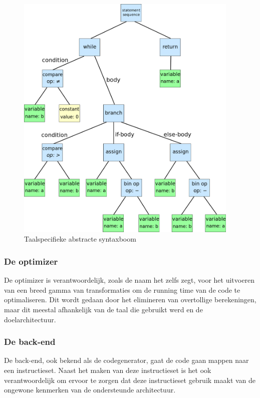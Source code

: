 \begin{figure} [ht]
	\centering
	\includegraphics[width=0.95\textwidth]{img/syntaxtree.png}
	\caption{Taalspecifieke abstracte syntaxboom}
	\label{fig:syntaxtree}
\end{figure}

\subsubsection{De optimizer}
De optimizer is verantwoordelijk, zoals de naam het zelfs zegt, voor het uitvoeren van een breed gamma van transformaties om de running time van de code te optimaliseren. Dit wordt gedaan door het elimineren van overtollige berekeningen, maar dit meestal afhankelijk van de taal die gebruikt werd en de doelarchitectuur.

\subsubsection{De back-end}
De back-end, ook bekend als de codegenerator, gaat de code gaan mappen naar een instructieset. Naast het maken van deze instructieset is het ook verantwoordelijk om ervoor te zorgen dat deze instructieset gebruik maakt van de ongewone kenmerken van de ondersteunde architectuur. 

